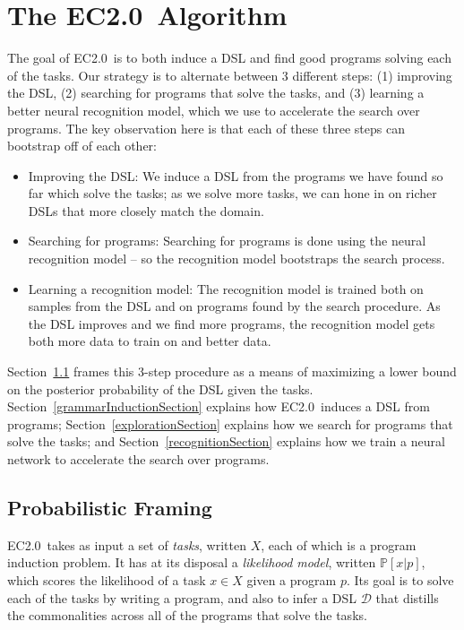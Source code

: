 \documentclass{article}
\newcommand{\system}{EC2.0~}
\newcommand{\probability}{\mathds{P}} %
\begin{document}
\section{The \system Algorithm}

The goal of \system is to both induce a DSL and find good programs solving each of the tasks.
Our strategy is to
alternate between 3 different steps: (1) improving the DSL, (2) searching for programs that solve the tasks, and (3) learning a
better neural recognition model, which we use to accelerate the search over programs.
The key observation here is that each of these three steps can bootstrap off of each other:

\begin{itemize}
\item Improving the DSL: We induce a DSL from the programs we have found so far which solve the tasks;
  as we solve more tasks, we can hone in on richer DSLs that more closely match the domain.
\item Searching for programs: Searching for programs is done using the neural recognition model --
  so the recognition model bootstraps the search process.
  \item Learning a recognition model: The recognition model is trained both on samples from the DSL and on programs found by the search procedure. As the DSL improves and we find more programs, the recognition model gets both more data to train on and better data.
\end{itemize}

Section~\ref{mathematicalFraming} frames this 3-step procedure as
a means of maximizing a lower bound on the posterior probability of the DSL given the tasks.
Section~\ref{grammarInductionSection} explains how \system induces a DSL from programs;
Section~\ref{explorationSection} explains how we search for programs that solve the tasks; and Section~\ref{recognitionSection}
explains how we train a neural network to accelerate the search over programs.

\subsection{Probabilistic Framing}\label{mathematicalFraming}

\system takes as input a set of \emph{tasks}, written $X$, each of which is a program induction problem.
It has at its disposal a \emph{likelihood model}, written $\probability[x|p]$, which scores the likelihood of a task $x\in X$ given a program $p$.
Its goal is to solve each of the tasks by writing a program,
and also to infer a DSL $\mathcal{D}$ that distills the commonalities across all of the programs that solve the tasks.
\end{document}
